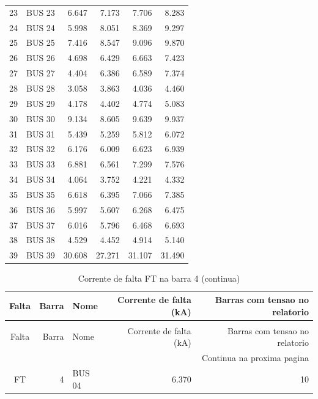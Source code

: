 \documentclass[12pt]{classe_uftex/uftex}
\begin{document}
\begin{longtable}{rlrrrr}
23 & BUS 23 & 6.647 & 7.173 & 7.706 & 8.283 \\
24 & BUS 24 & 5.998 & 8.051 & 8.369 & 9.297 \\
25 & BUS 25 & 7.416 & 8.547 & 9.096 & 9.870 \\
26 & BUS 26 & 4.698 & 6.429 & 6.663 & 7.423 \\
27 & BUS 27 & 4.404 & 6.386 & 6.589 & 7.374 \\
28 & BUS 28 & 3.058 & 3.863 & 4.036 & 4.460 \\
29 & BUS 29 & 4.178 & 4.402 & 4.774 & 5.083 \\
30 & BUS 30 & 9.134 & 8.605 & 9.639 & 9.937 \\
31 & BUS 31 & 5.439 & 5.259 & 5.812 & 6.072 \\
32 & BUS 32 & 6.176 & 6.009 & 6.623 & 6.939 \\
33 & BUS 33 & 6.881 & 6.561 & 7.299 & 7.576 \\
34 & BUS 34 & 4.064 & 3.752 & 4.221 & 4.332 \\
35 & BUS 35 & 6.618 & 6.395 & 7.066 & 7.385 \\
36 & BUS 36 & 5.997 & 5.607 & 6.268 & 6.475 \\
37 & BUS 37 & 6.016 & 5.796 & 6.468 & 6.693 \\
38 & BUS 38 & 4.529 & 4.452 & 4.914 & 5.140 \\
39 & BUS 39 & 30.608 & 27.271 & 31.107 & 31.490 \\
\end{longtable}
\normalsize

\small
\begin{longtable}{crlrr}
\caption{Corrente de falta FT na barra 4}\label{tab:anafas-ft4-corrente}\\
\toprule
Falta & Barra & Nome & Corrente de falta (kA) & Barras com tensao no relatorio \\
\midrule
\endfirsthead
\caption[]{Corrente de falta FT na barra 4 (continua)}\\
\toprule
Falta & Barra & Nome & Corrente de falta (kA) & Barras com tensao no relatorio \\
\midrule
\endhead
\midrule
\multicolumn{5}{r}{Continua na proxima pagina}\\
\endfoot
\bottomrule
\endlastfoot
FT & 4 & BUS 04 & 6.370 & 10 \\
\end{longtable}
\normalsize
\end{document}

